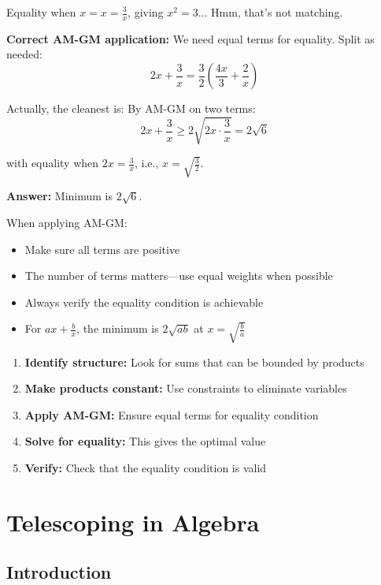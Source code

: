 \documentclass[12pt]{extarticle}
\begin{document}
\begin{examplebox}
Equality when $x = x = \frac{3}{x}$, giving $x^2 = 3$... Hmm, that's not matching.

\textbf{Correct AM-GM application:} We need equal terms for equality. Split as needed:
\[
2x + \frac{3}{x} = \frac{3}{2}\left(\frac{4x}{3} + \frac{2}{x}\right)
\]

Actually, the cleanest is: By AM-GM on two terms:
\[
2x + \frac{3}{x} \ge 2\sqrt{2x \cdot \frac{3}{x}} = 2\sqrt{6}
\]

with equality when $2x = \frac{3}{x}$, i.e., $x = \sqrt{\frac{3}{2}}$.

\textbf{Answer:} Minimum is $\boxed{2\sqrt{6}}$.
\end{examplebox}

\begin{remarkbox}
When applying AM-GM:
\begin{itemize}
    \item Make sure all terms are positive
    \item The number of terms matters—use equal weights when possible
    \item Always verify the equality condition is achievable
    \item For $ax + \frac{b}{x}$, the minimum is $2\sqrt{ab}$ at $x = \sqrt{\frac{b}{a}}$
\end{itemize}
\end{remarkbox}

\begin{conceptbox}
\begin{enumerate}
    \item \textbf{Identify structure:} Look for sums that can be bounded by products
    \item \textbf{Make products constant:} Use constraints to eliminate variables
    \item \textbf{Apply AM-GM:} Ensure equal terms for equality condition
    \item \textbf{Solve for equality:} This gives the optimal value
    \item \textbf{Verify:} Check that the equality condition is valid
\end{enumerate}
\end{conceptbox}

\section{Telescoping in Algebra}

\subsection*{Introduction}
\end{document}
